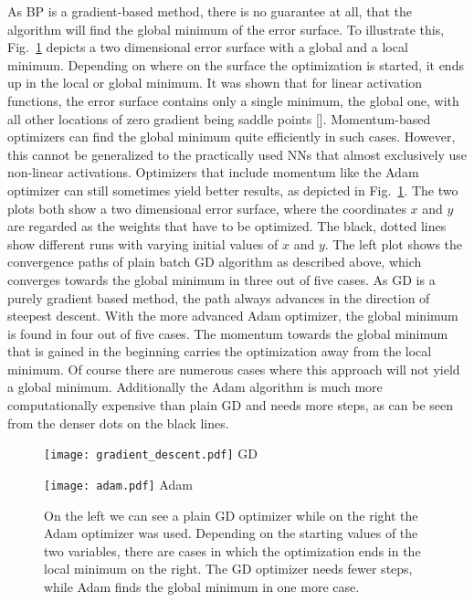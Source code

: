 As BP is a gradient-based method, there is no guarantee at all, that the
algorithm will find the global minimum of the error surface.  To illustrate
this, Fig.~\ref{fig:error_surface_bgd} depicts a two dimensional error surface
with a global and a local minimum.  Depending on where on the surface the
optimization is started, it ends up in the local or global minimum.  It was
shown that for linear activation functions, the error surface contains only a
single minimum, the global one, with all other locations of zero gradient being
saddle points [\cite{BALDI}]. Momentum-based optimizers can find the global
minimum quite efficiently in such cases. However, this cannot be generalized to
the practically used NNs that almost exclusively use non-linear activations.
Optimizers that include momentum like the Adam optimizer can still sometimes
yield better results, as depicted in Fig.~\ref{fig:error_surface_bgd}.  The two
plots both show a two dimensional error surface, where the coordinates $x$ and
$y$ are regarded as the weights that have to be optimized.  The black, dotted
lines show different runs with varying initial values of $x$ and $y$.  The left
plot shows the convergence paths of plain batch GD algorithm as described
above, which converges towards the global minimum in three out of five cases.
As GD is a purely gradient based method, the path always advances in the
direction of steepest descent.  With the more advanced Adam optimizer, the
global minimum is found in four out of five cases. The momentum towards the
global minimum that is gained in the beginning carries the optimization away
from the local minimum.  Of course there are numerous cases where this approach
will not yield a global minimum. Additionally the Adam algorithm is much more
computationally expensive than plain GD and needs more steps, as can be seen
from the denser dots on the black lines.
\begin{figure}
  \begin{minipage}[b]{.49\textwidth}
    \centering
    \texttt{[image: gradient\_descent.pdf]}
    GD
  \end{minipage}
  \hspace{.02\textwidth}
  \begin{minipage}[b]{.49\textwidth}
    \centering
    \texttt{[image: adam.pdf]}
    Adam
  \end{minipage}
  \caption{On the left we can see a plain GD optimizer while on the right the
    Adam optimizer was used.  Depending on the starting values of the two
    variables, there are cases in which the optimization ends in the local
    minimum on the right. The GD optimizer needs fewer steps, while Adam finds
    the global minimum in one more case.}
  \label{fig:error_surface_bgd}
\end{figure}

